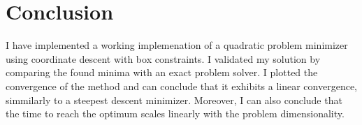 \documentclass[a4paper]{article}
\begin{document}
\section{Conclusion}
I have implemented a working implemenation of a quadratic problem minimizer
using coordinate descent with box constraints. I validated my solution by
comparing the found minima with an exact problem solver. I plotted the
convergence of the method and can conclude that it exhibits a linear
convergence, simmilarly to a steepest descent minimizer. Moreover, I can also
conclude that the time to reach the optimum scales linearly with the problem dimensionality.
\end{document}
